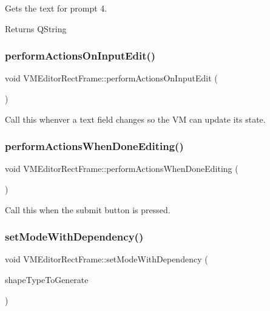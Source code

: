 Gets the text for prompt 4. 

\begin{DoxyReturn}{Returns}
Q\+String 
\end{DoxyReturn}
\mbox{\label{class_v_m_editor_rect_frame_ade820d17c7487ae91721d49121d2f264}} 
\subsubsection{\texorpdfstring{performActionsOnInputEdit()}{performActionsOnInputEdit()}}
{\footnotesize\ttfamily void V\+M\+Editor\+Rect\+Frame\+::perform\+Actions\+On\+Input\+Edit (\begin{DoxyParamCaption}{ }\end{DoxyParamCaption})}



Call this whenver a text field changes so the VM can update its state. 

\mbox{\label{class_v_m_editor_rect_frame_ac6a551f7a631ed2b7ca4c48c7883fdfb}} 
\subsubsection{\texorpdfstring{performActionsWhenDoneEditing()}{performActionsWhenDoneEditing()}}
{\footnotesize\ttfamily void V\+M\+Editor\+Rect\+Frame\+::perform\+Actions\+When\+Done\+Editing (\begin{DoxyParamCaption}{ }\end{DoxyParamCaption})}



Call this when the submit button is pressed. 

\mbox{\label{class_v_m_editor_rect_frame_ac7282ca7fde9018068e261e40e1cf47d}} 
\subsubsection{\texorpdfstring{setModeWithDependency()}{setModeWithDependency()}\hspace{0.1cm}{\footnotesize\ttfamily [1/2]}}
{\footnotesize\ttfamily void V\+M\+Editor\+Rect\+Frame\+::set\+Mode\+With\+Dependency (\begin{DoxyParamCaption}\item[{\mbox{\hyperlink{class_i_shape_a8f50993477b5ddb44c0547ef3d547cdc}{I\+Shape\+::\+Shape\+Type}}}]{shape\+Type\+To\+Generate }\end{DoxyParamCaption})}



